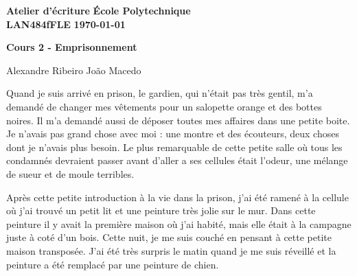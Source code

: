 \documentclass[10pt]{article} %
\newcommand{\createHeader}[5]{
	\noindent
	\normalsize\textbf{#2} \hfill \textbf{#1}\\
	\normalsize\textbf{#3} \hfill \textbf{\today}\vspace{20pt}
	\centerline{\Large \textbf{#5}}\vspace{1pt}
	\centerline{\small #4}\vspace{20pt}}
\begin{document}
	\createHeader{École Polytechnique}{Atelier d'écriture}{LAN484fFLE}{Alexandre Ribeiro João Macedo}{Cours 2 - Emprisonnement}
Quand je suis arrivé en prison, le gardien, qui n'était pas très gentil, m'a demandé de changer mes vêtements pour un salopette orange et des bottes noires. Il m'a demandé aussi de déposer toutes mes affaires dans une petite boite. Je n'avais pas grand chose avec moi : une montre et des écouteurs, deux choses dont je n’avais plus besoin. Le plus remarquable de cette petite salle où tous les condamnés devraient passer avant d'aller a ses cellules était l'odeur, une mélange de sueur et de moule terribles.

Après cette petite introduction à la vie dans la prison, j'ai été ramené à la cellule où j'ai trouvé un petit lit et une peinture très jolie sur le mur. Dans cette peinture il y avait la première maison où j'ai habité, mais elle était à la campagne juste à coté d’un bois. Cette nuit, je me suis couché en pensant à cette petite maison transposée. J'ai été très surpris le matin quand je me suis réveillé et la peinture a été remplacé par une peinture de chien. 
\end{document}
